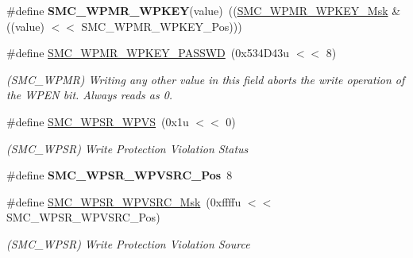 \begin{DoxyCompactItemize}
\mbox{\label{group__SAMV71__SMC_gad1c580c59fc56bf766d0ef3484f44f44}} 
\#define {\bfseries S\+M\+C\+\_\+\+W\+P\+M\+R\+\_\+\+W\+P\+K\+EY}(value)~((\mbox{\hyperlink{group__SAMV71__SMC_ga588e57ce3327f3036091fae414adc054}{S\+M\+C\+\_\+\+W\+P\+M\+R\+\_\+\+W\+P\+K\+E\+Y\+\_\+\+Msk}} \& ((value) $<$$<$ S\+M\+C\+\_\+\+W\+P\+M\+R\+\_\+\+W\+P\+K\+E\+Y\+\_\+\+Pos)))
\item 
\mbox{\label{group__SAMV71__SMC_ga704d5be56badbe9b71f14e9604fdabc7}} 
\#define \mbox{\hyperlink{group__SAMV71__SMC_ga704d5be56badbe9b71f14e9604fdabc7}{S\+M\+C\+\_\+\+W\+P\+M\+R\+\_\+\+W\+P\+K\+E\+Y\+\_\+\+P\+A\+S\+S\+WD}}~(0x534\+D43u $<$$<$ 8)
\begin{DoxyCompactList}\small\item\em (S\+M\+C\+\_\+\+W\+P\+MR) Writing any other value in this field aborts the write operation of the W\+P\+EN bit. Always reads as 0. \end{DoxyCompactList}\item 
\mbox{\label{group__SAMV71__SMC_ga03b1d62fbf36357cc008315104a140c4}} 
\#define \mbox{\hyperlink{group__SAMV71__SMC_ga03b1d62fbf36357cc008315104a140c4}{S\+M\+C\+\_\+\+W\+P\+S\+R\+\_\+\+W\+P\+VS}}~(0x1u $<$$<$ 0)
\begin{DoxyCompactList}\small\item\em (S\+M\+C\+\_\+\+W\+P\+SR) Write Protection Violation Status \end{DoxyCompactList}\item 
\mbox{\label{group__SAMV71__SMC_ga82f6511278bd924f5dece5a562e8ec26}} 
\#define {\bfseries S\+M\+C\+\_\+\+W\+P\+S\+R\+\_\+\+W\+P\+V\+S\+R\+C\+\_\+\+Pos}~8
\item 
\mbox{\label{group__SAMV71__SMC_ga48efdac8353b5b525f55005c016e8548}} 
\#define \mbox{\hyperlink{group__SAMV71__SMC_ga48efdac8353b5b525f55005c016e8548}{S\+M\+C\+\_\+\+W\+P\+S\+R\+\_\+\+W\+P\+V\+S\+R\+C\+\_\+\+Msk}}~(0xffffu $<$$<$ S\+M\+C\+\_\+\+W\+P\+S\+R\+\_\+\+W\+P\+V\+S\+R\+C\+\_\+\+Pos)
\begin{DoxyCompactList}\small\item\em (S\+M\+C\+\_\+\+W\+P\+SR) Write Protection Violation Source \end{DoxyCompactList}\item 

\end{DoxyCompactItemize}
